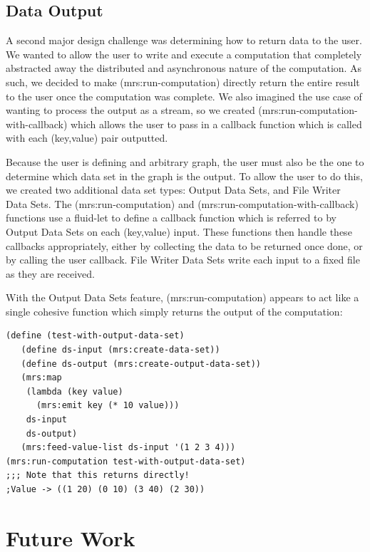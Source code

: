 \documentclass{article}
\begin{document}
\subsection{Data Output}

A second major design challenge was determining how to return data to the user.
We wanted to allow the user to write and execute a computation that completely
abstracted away the distributed and asynchronous nature of the computation. As
such, we decided to make (mrs:run-computation) directly return the entire
result to the user once the computation was complete. We also imagined the use
case of wanting to process the output as a stream, so we created (mrs:run-computation-with-callback)
which allows the user to pass in a callback function which is called with each
(key,value) pair outputted.

Because the user is defining and arbitrary graph, the user must also be the one
to determine which data set in the graph is the output. To allow the user to do
this, we created two additional data set types: Output Data Sets, and File Writer Data Sets.
The (mrs:run-computation) and (mrs:run-computation-with-callback) functions use
a fluid-let to define a callback function which is referred to by Output Data Sets
on each (key,value) input. These functions then handle these callbacks appropriately,
either by collecting the data to be returned once done, or by calling the user
callback. File Writer Data Sets write each input to a fixed file as they are received.

With the Output Data Sets feature, (mrs:run-computation) appears to act like a
single cohesive function which simply returns the output of the computation:

\begin{verbatim}
(define (test-with-output-data-set)               
   (define ds-input (mrs:create-data-set))        
   (define ds-output (mrs:create-output-data-set))
   (mrs:map                                       
    (lambda (key value)                           
      (mrs:emit key (* 10 value)))                
    ds-input                                      
    ds-output)                                    
   (mrs:feed-value-list ds-input '(1 2 3 4)))     
(mrs:run-computation test-with-output-data-set)  
;;; Note that this returns directly!              
;Value -> ((1 20) (0 10) (3 40) (2 30))
\end{verbatim}           


\section{Future Work}
\end{document}
